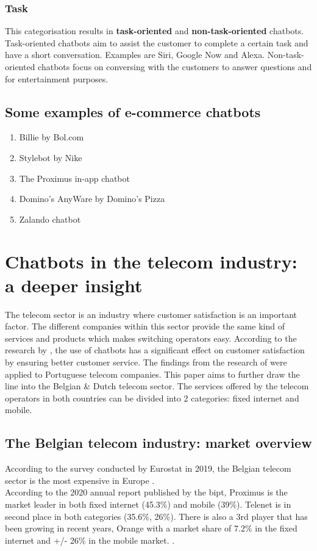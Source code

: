 \subsubsection{Task}
This categorisation results in \textbf{task-oriented} and \textbf{non-task-oriented} chatbots. Task-oriented chatbots aim to assist the customer to complete a certain task and have a short conversation. Examples are Siri, Google Now and Alexa. Non-task-oriented chatbots focus on conversing with the customers to answer questions and for entertainment purposes. \citep{Nuruzzaman2018}

\subsection{Some examples of e-commerce chatbots}
\begin{enumerate}
	\setlength\itemsep{-0.1em}
	\item Billie by Bol.com
	\item Stylebot by Nike
	\item The Proximus in-app chatbot
	\item Domino's AnyWare by Domino's Pizza
	\item Zalando chatbot
\end{enumerate}

\section{Chatbots in the telecom industry: a deeper insight}
The telecom sector is an industry where customer satisfaction is an important factor. The different companies within this sector provide the same kind of services and products which makes switching operators easy. According to the research by \citep{Quintino2019}, the use of chatbots has a significant effect on customer satisfaction by ensuring better customer service. The findings from the research of \citeauthor{Quintino1019} were applied to Portuguese telecom companies. This paper aims to further draw the line into the Belgian \& Dutch telecom sector. The services offered by the telecom operators in both countries can be divided into 2 categories: fixed internet and mobile.

\subsection{The Belgian telecom industry: market overview}
According to the survey conducted by Eurostat in 2019, the Belgian telecom sector is the most expensive in Europe \citep{Eurostat2020}.\\
According to the 2020 annual report published by the \acrfull{bipt}, Proximus is the market leader in both fixed internet (45.3\%) and mobile (39\%). Telenet is in second place in both categories (35.6\%, 26\%). There is also a 3rd player that has been growing in recent years, Orange with a market share of 7.2\% in the fixed internet and +/- 26\% in the mobile market. \citep*{BIPT2021,VanLeemputten2021}.

